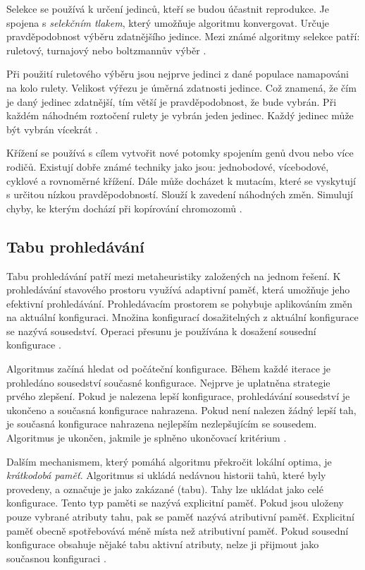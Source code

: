 Selekce se používá k určení jedinců, kteří se budou účastnit reprodukce.
Je spojena s \textit{selekčním tlakem}, který umožňuje algoritmu konvergovat.
Určuje pravděpodobnost výběru zdatnějšího jedince.
Mezi známé algoritmy selekce patří: ruletový, turnajový nebo boltzmannův výběr \cite{katoch}.

Při použití ruletového výběru jsou nejprve jedinci z dané populace namapováni na kolo rulety.
Velikost výřezu je úměrná zdatnosti jedince.
Což znamená, že čím je daný jedinec zdatnější, tím větší je pravděpodobnost, že bude vybrán.
Při každém náhodném roztočení rulety je vybrán jeden jedinec.
Každý jedinec může být vybrán vícekrát \cite{katoch}.

Křížení se používá s cílem vytvořit nové potomky spojením genů dvou nebo více rodičů.
Existují dobře známé techniky jako jsou: jednobodové, vícebodové, cyklové a rovnoměrné křížení.
Dále může docházet k mutacím, které se vyskytují s určitou nízkou pravděpodobností.
Slouží k zavedení náhodných změn.
Simulují chyby, ke kterým dochází při kopírování chromozomů \cite{katoch}.


\subsection{Tabu prohledávání}
Tabu prohledávání patří mezi metaheuristiky založených na jednom řešení.
K prohledávání stavového prostoru využívá adaptivní paměť, která umožňuje jeho efektivní prohledávání.
Prohledávacím prostorem se pohybuje aplikováním změn na aktuální konfiguraci.
Množina konfigurací dosažitelných z aktuální konfigurace se nazývá sousedství.
Operaci přesunu je používána k dosažení sousední konfigurace \cite{laguna}.

Algoritmus začíná hledat od počáteční konfigurace.
Během každé iterace je prohledáno sousedství současné konfigurace.
Nejprve je uplatněna strategie prvého zlepšení.
Pokud je nalezena lepší konfigurace, prohledávání sousedství je ukončeno a současná konfigurace nahrazena.
Pokud není nalezen žádný lepší tah, je současná konfigurace nahrazena nejlepším nezlepšujícím se sousedem.
Algoritmus je ukončen, jakmile je splněno ukončovací kritérium \cite{laguna}.

Dalším mechanismem, který pomáhá algoritmu překročit lokální optima, je \textit{krátkodobá paměť}.
Algoritmus si ukládá nedávnou historii tahů, které byly provedeny, a označuje je jako zakázané (tabu).
Tahy lze ukládat jako celé konfigurace.
Tento typ paměti se nazývá explicitní paměť.
Pokud jsou uloženy pouze vybrané atributy tahu, pak se paměť nazývá atributivní paměť.
Explicitní paměť obecně spotřebovává méně místa než atributivní paměť.
Pokud sousední konfigurace obsahuje nějaké tabu aktivní atributy, nelze ji přijmout jako současnou konfiguraci \cite{laguna}.

